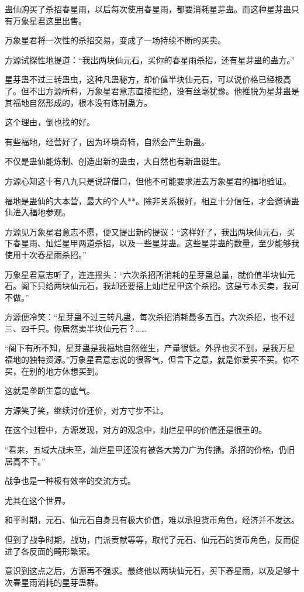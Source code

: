 \begin{this_body}
蛊仙购买了杀招春星雨，以后每次使用春星雨，都要消耗星芽蛊。而这种星芽蛊只有万象星君这里出售。

万象星君将一次性的杀招交易，变成了一场持续不断的买卖。

方源试探性地提道：“我出两块仙元石，买你的春星雨杀招，还有星芽蛊的蛊方。”

星芽蛊不过三转蛊虫，这种凡蛊秘方，却价值半块仙元石，可以说价格已经极高了。但不出方源所料，万象星君意志直接拒绝，没有丝毫犹豫。他推脱为星芽蛊是其福地自然形成的，根本没有炼制蛊方。

这个理由，倒也找的好。

有些福地，经营好了，因为环境奇特，自然会产生新蛊。

不仅是蛊仙能炼制、创造出新的蛊虫，大自然也有新蛊诞生。

方源心知这十有八九只是说辞借口，但他不可能要求进去万象星君的福地验证。

福地是蛊仙的大本营，最大的个人**。除非关系极好，相互十分信任，才会邀请蛊仙进入福地参观。

方源见万象星君意志不愿，便又提出新的提议：“这样好了，我出两块仙元石，买下春星雨、灿烂星甲两道杀招，以及一些星芽蛊。这些星芽蛊的数量，至少能够我使用十次春星雨杀招。”

万象星君意志听了，连连摇头：“六次杀招所消耗的星芽蛊总量，就价值半块仙元石。阁下只给两块仙元石，我却还要搭上灿烂星甲这个杀招。这是亏本买卖，我可不做。”

方源便冷笑：“星芽蛊不过三转凡蛊，每次杀招消耗最多五百。六次杀招，也不过三、四千只。你居然卖半块仙元石？……

“阁下有所不知，星芽蛊是我福地自然催生，产量很低。外界也买不到，是我万星福地的独特资源。”万象星君意志说的很客气，但言下之意，就是你爱买不买。你不买，在别的地方休想买到。

这就是垄断生意的底气。

方源笑了笑，继续讨价还价，对方寸步不让。

在这个过程中，方源发现，对方的观念中，灿烂星甲的价值还是很重的。

“看来，五域大战未至，灿烂星甲还没有被各大势力广为传播。杀招的价格，仍旧居高不下。”

战争也是一种极有效率的交流方式。

尤其在这个世界。

和平时期，元石、仙元石自身具有极大价值，难以承担货币角色，经济并不发达。

但到了战争时期，战功，门派贡献等等，取代了元石、仙元石的货币角色，反而促进了各反面的畸形繁荣。

意识到这点之后，方源再不强求。最终他以两块仙元石，买下春星雨，以及足够十次春星雨消耗的星芽蛊群。


\end{this_body}
